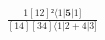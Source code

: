 \documentclass[varwidth, border=5pt]{standalone}
\begin{document}
\begin{my}
$\begin{gathered}
\scriptscriptstyle\frac{1[12]²⟨1|𝟓|1]}{[14][34]⟨1|2+4|3]}
\end{gathered}$
\end{my}
\end{document}
